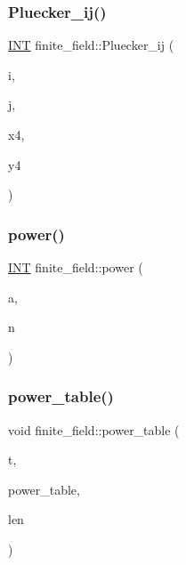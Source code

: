 \subsubsection{\texorpdfstring{Pluecker\+\_\+ij()}{Pluecker\_ij()}}
{\footnotesize\ttfamily \mbox{\hyperlink{galois_8h_a09fddde158a3a20bd2dcadb609de11dc}{I\+NT}} finite\+\_\+field\+::\+Pluecker\+\_\+ij (\begin{DoxyParamCaption}\item[{\mbox{\hyperlink{galois_8h_a09fddde158a3a20bd2dcadb609de11dc}{I\+NT}}}]{i,  }\item[{\mbox{\hyperlink{galois_8h_a09fddde158a3a20bd2dcadb609de11dc}{I\+NT}}}]{j,  }\item[{\mbox{\hyperlink{galois_8h_a09fddde158a3a20bd2dcadb609de11dc}{I\+NT}} $\ast$}]{x4,  }\item[{\mbox{\hyperlink{galois_8h_a09fddde158a3a20bd2dcadb609de11dc}{I\+NT}} $\ast$}]{y4 }\end{DoxyParamCaption})}

\mbox{\label{classfinite__field_a0437871b8f775f0b2d589188d9ad7e61}} 
\subsubsection{\texorpdfstring{power()}{power()}}
{\footnotesize\ttfamily \mbox{\hyperlink{galois_8h_a09fddde158a3a20bd2dcadb609de11dc}{I\+NT}} finite\+\_\+field\+::power (\begin{DoxyParamCaption}\item[{\mbox{\hyperlink{galois_8h_a09fddde158a3a20bd2dcadb609de11dc}{I\+NT}}}]{a,  }\item[{\mbox{\hyperlink{galois_8h_a09fddde158a3a20bd2dcadb609de11dc}{I\+NT}}}]{n }\end{DoxyParamCaption})}

\mbox{\label{classfinite__field_a0a40a20b88342c6d3aafb73050ef5256}} 
\subsubsection{\texorpdfstring{power\+\_\+table()}{power\_table()}}
{\footnotesize\ttfamily void finite\+\_\+field\+::power\+\_\+table (\begin{DoxyParamCaption}\item[{\mbox{\hyperlink{galois_8h_a09fddde158a3a20bd2dcadb609de11dc}{I\+NT}}}]{t,  }\item[{\mbox{\hyperlink{galois_8h_a09fddde158a3a20bd2dcadb609de11dc}{I\+NT}} $\ast$}]{power\+\_\+table,  }\item[{\mbox{\hyperlink{galois_8h_a09fddde158a3a20bd2dcadb609de11dc}{I\+NT}}}]{len }\end{DoxyParamCaption})}

